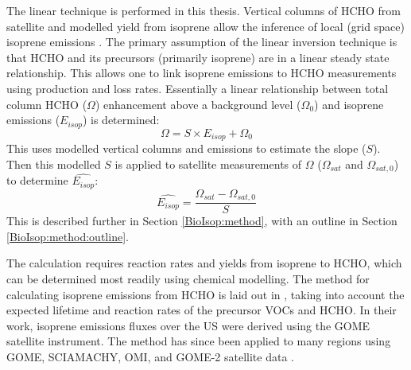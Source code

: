       The linear technique is performed in this thesis.
      Vertical columns of HCHO from satellite and modelled yield from isoprene allow the inference of local (grid space) isoprene emissions \parencite{Palmer2003, Millet2006,Marais2012,Surl2018}.
      The primary assumption of the linear inversion technique is that HCHO and its precursors (primarily isoprene) are in a linear steady state relationship.
      This allows one to link isoprene emissions to HCHO measurements using production and loss rates.
      Essentially a linear relationship between total column HCHO ($\Omega$) enhancement above a background level ($\Omega_0$) and isoprene emissions ($E_{isop}$) is determined:
      \begin{equation*}
        \Omega = S \times E_{isop} + \Omega_0
      \end{equation*}
      This uses modelled vertical columns and emissions to estimate the slope ($S$).
      Then this modelled $S$ is applied to satellite measurements of $\Omega$ ($\Omega_{sat}$ and $\Omega_{sat,0}$) to determine $\hat{E_{isop}}$:
      \begin{equation*}
        \hat{E_{isop}} = \frac{\Omega_{sat} - \Omega_{sat,0}}{S}
      \end{equation*}
      This is described further in Section \ref{BioIsop:method}, with an outline in Section \ref{BioIsop:method:outline}.
      
      The calculation requires reaction rates and yields from isoprene to HCHO, which can be determined most readily using chemical modelling.
      The method for calculating isoprene emissions from HCHO is laid out in \textcite{Palmer2003}, taking into account the expected lifetime and reaction rates of the precursor VOCs and HCHO.
      In their work, isoprene emissions fluxes over the US were derived using the GOME satellite instrument.
      The method has since been applied to many regions using GOME, SCIAMACHY, OMI, and GOME-2 satellite data \parencite[e.g.,][]{Abbot2003, Barkley2013, Stavrakou2014, Surl2018}.
      
